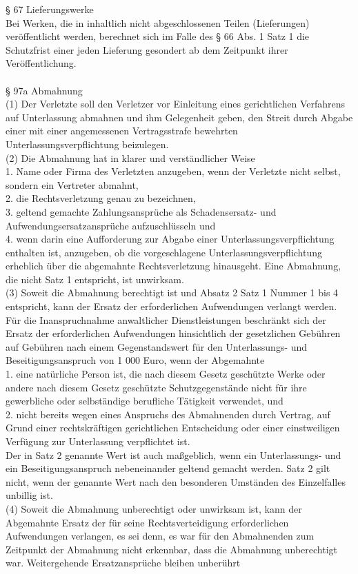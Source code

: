 \documentclass[12pt,titlepage]{report}
\begin{document}
§ 67 Lieferungswerke\\
Bei Werken, die in inhaltlich nicht abgeschlossenen Teilen (Lieferungen) veröffentlicht werden, berechnet sich im Falle des § 66 Abs. 1 Satz 1 die Schutzfrist einer jeden Lieferung gesondert ab dem Zeitpunkt ihrer Veröffentlichung.\\\\

§ 97a Abmahnung\\
(1) Der Verletzte soll den Verletzer vor Einleitung eines gerichtlichen Verfahrens auf Unterlassung abmahnen und ihm Gelegenheit geben, den Streit durch Abgabe einer mit einer angemessenen Vertragsstrafe bewehrten Unterlassungsverpflichtung beizulegen.\\
(2) Die Abmahnung hat in klarer und verständlicher Weise\\
1.
Name oder Firma des Verletzten anzugeben, wenn der Verletzte nicht selbst, sondern ein Vertreter abmahnt,\\
2.
die Rechtsverletzung genau zu bezeichnen,\\
3.
geltend gemachte Zahlungsansprüche als Schadensersatz- und Aufwendungsersatzansprüche aufzuschlüsseln und\\
4.
wenn darin eine Aufforderung zur Abgabe einer Unterlassungsverpflichtung enthalten ist, anzugeben, ob die vorgeschlagene Unterlassungsverpflichtung erheblich über die abgemahnte Rechtsverletzung hinausgeht.
Eine Abmahnung, die nicht Satz 1 entspricht, ist unwirksam.\\
(3) Soweit die Abmahnung berechtigt ist und Absatz 2 Satz 1 Nummer 1 bis 4 entspricht, kann der Ersatz der erforderlichen Aufwendungen verlangt werden. Für die Inanspruchnahme anwaltlicher Dienstleistungen beschränkt sich der Ersatz der erforderlichen Aufwendungen hinsichtlich der gesetzlichen Gebühren auf Gebühren nach einem Gegenstandswert für den Unterlassungs- und Beseitigungsanspruch von 1 000 Euro, wenn der Abgemahnte\\
1.
eine natürliche Person ist, die nach diesem Gesetz geschützte Werke oder andere nach diesem Gesetz geschützte Schutzgegenstände nicht für ihre gewerbliche oder selbständige berufliche Tätigkeit verwendet, und\\
2.
nicht bereits wegen eines Anspruchs des Abmahnenden durch Vertrag, auf Grund einer rechtskräftigen gerichtlichen Entscheidung oder einer einstweiligen Verfügung zur Unterlassung verpflichtet ist.\\
Der in Satz 2 genannte Wert ist auch maßgeblich, wenn ein Unterlassungs- und ein Beseitigungsanspruch nebeneinander geltend gemacht werden. Satz 2 gilt nicht, wenn der genannte Wert nach den besonderen Umständen des Einzelfalles unbillig ist.\\
(4) Soweit die Abmahnung unberechtigt oder unwirksam ist, kann der Abgemahnte Ersatz der für seine Rechtsverteidigung erforderlichen Aufwendungen verlangen, es sei denn, es war für den Abmahnenden zum Zeitpunkt der Abmahnung nicht erkennbar, dass die Abmahnung unberechtigt war. Weitergehende Ersatzansprüche bleiben unberührt\\\\
\end{document}

